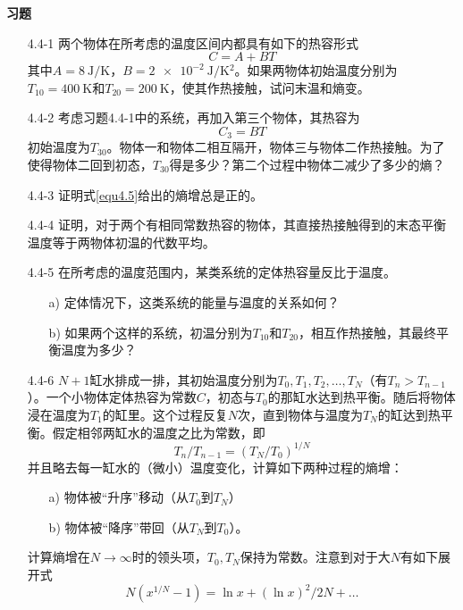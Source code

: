 {\bf 习题}
\begin{itemize}
\item[4.4-1] 两个物体在所考虑的温度区间内都具有如下的热容形式
\begin{equation*}
C=A+BT
\end{equation*}
其中$A=\SI{8}{\joule/\kelvin}$，$B=\SI{2e-2}{\joule/\kelvin^2}$。如果两物体初始温度分别为$T_{10}=\SI{400}{\kelvin}$和$T_{20}=\SI{200}{\kelvin}$，使其作热接触，试问末温和熵变。
\item[4.4-2] 考虑习题4.4-1中的系统，再加入第三个物体，其热容为
\begin{equation*}
C_3=BT
\end{equation*}
初始温度为$T_{30}$。物体一和物体二相互隔开，物体三与物体二作热接触。为了使得物体二回到初态，$T_{30}$得是多少？第二个过程中物体二减少了多少的熵？
\item[4.4-3] 证明式\eqref{equ4.5}给出的熵增总是正的。
\item[4.4-4] 证明，对于两个有相同常数热容的物体，其直接热接触得到的末态平衡温度等于两物体初温的代数平均。
\item[4.4-5] 在所考虑的温度范围内，某类系统的定体热容量反比于温度。
	\begin{itemize}
	\item[a)] 定体情况下，这类系统的能量与温度的关系如何？
	\item[b)] 如果两个这样的系统，初温分别为$T_{10}$和$T_{20}$，相互作热接触，其最终平衡温度为多少？
	\end{itemize}
\item[4.4-6] $N+1$缸水排成一排，其初始温度分别为$T_0,T_1,T_2,\dots,T_N$（有$T_n>T_{n-1}$）。一个小物体定体热容为常数$C$，初态与$T_0$的那缸水达到热平衡。随后将物体浸在温度为$T_1$的缸里。这个过程反复$N$次，直到物体与温度为$T_N$的缸达到热平衡。假定相邻两缸水的温度之比为常数，即
\begin{equation*}
T_n/T_{n-1} = (T_N/T_0)^{1/N}
\end{equation*}
并且略去每一缸水的（微小）温度变化，计算如下两种过程的熵增：
	\begin{itemize}
	\item[a)] 物体被“升序”移动（从$T_0$到$T_N$）
	\item[b)] 物体被“降序”带回（从$T_N$到$T_0$）。
	\end{itemize}
计算熵增在$N\rightarrow \infty$时的领头项，$T_0,T_N$保持为常数。注意到对于大$N$有如下展开式
\begin{equation*}
N(x^{1/N}-1)=\ln x+(\ln x)^2/2N+\dots
\end{equation*}
\end{itemize}



